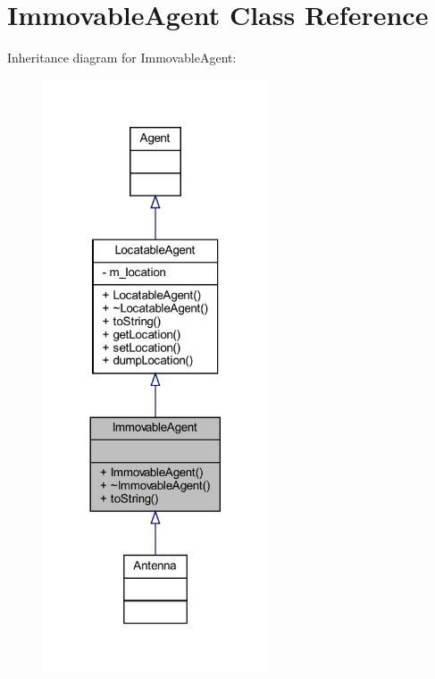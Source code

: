 \hypertarget{class_immovable_agent}{}\section{Immovable\+Agent Class Reference}
\label{class_immovable_agent}


Inheritance diagram for Immovable\+Agent\+:\nopagebreak
\begin{figure}[H]
\begin{center}
\leavevmode
\includegraphics[width=189pt]{class_immovable_agent__inherit__graph}
\end{center}
\end{figure}


